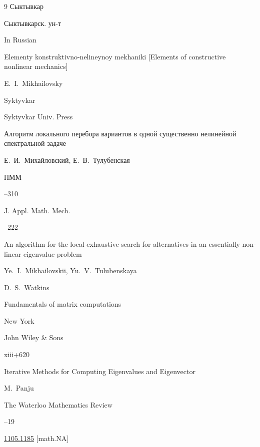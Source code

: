 \begin{thebibliography}{9}
\publaddr Сыктывкар

\publ Сыктывкарск. ун-т



\misctransl

\lang In Russian

\book Elementy konstruktivno-nelineynoy mekhaniki \rm [Elements of constructive nonlinear mechanics]

\by E.~I.~Mikhailovsky

\publaddr Syktyvkar

\publ Syktyvkar Univ. Press






\paper Алгоритм локального перебора вариантов в одной существенно нелинейной спектральной задаче

\by Е.~И.~Михайловский, Е.~В.~Тулубенская

\jour ПММ




--310

\transl

\jour J. Appl. Math. Mech.




–222

\paper An algorithm for the local exhaustive search for alternatives in an essentially non-linear eigenvalue problem

\by Ye.~I.~Mikhailovskii, Yu.~V.~Tulubenskaya





\by D.~S.~Watkins

\book Fundamentals of matrix computations

\publaddr New York

\publ John Wiley \& Sons


\totalpages xiii+620





\paper Iterative Methods for Computing Eigenvalues and Eigenvector

\by M.~Panju

\jour The Waterloo Mathematics Review



--19

\arxiv \href{http://arxiv.org/abs/1105.1185}{1105.1185} [math.NA]



\end{thebibliography}




